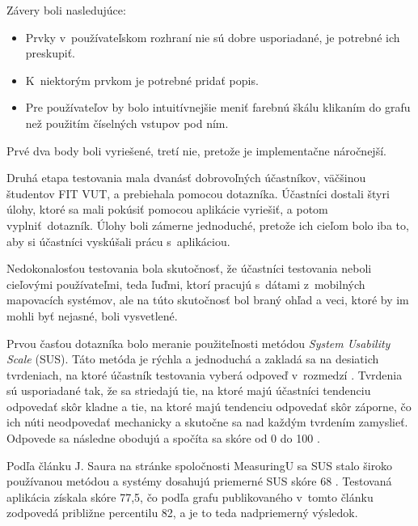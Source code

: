 Závery boli nasledujúce:
\begin{itemize}
    \item Prvky v~používateľskom rozhraní nie sú dobre usporiadané, je potrebné ich preskupiť.
    \item K~niektorým prvkom je potrebné pridať popis.
    \item Pre používateľov by bolo intuitívnejšie meniť farebnú škálu klikaním do grafu než použitím číselných vstupov pod ním.
\end{itemize}

Prvé dva body boli vyriešené, tretí nie, pretože je implementačne náročnejší.

Druhá etapa testovania mala dvanásť dobrovoľných účastníkov, väčšinou študentov FIT VUT, a prebiehala pomocou dotazníka. Účastníci dostali štyri úlohy, ktoré sa mali pokúsiť pomocou aplikácie vyriešiť, a potom vyplniť~dotazník. Úlohy boli zámerne jednoduché, pretože ich cieľom bolo iba to, aby si účastníci vyskúšali prácu s~aplikáciou.

Nedokonalosťou testovania bola skutočnosť, že účastníci testovania neboli cieľovými používateľmi, teda ľuďmi, ktorí pracujú s~dátami z~mobilných mapovacích systémov, ale na túto skutočnosť bol braný ohľad a veci, ktoré by im mohli byť nejasné, boli vysvetlené.

Prvou časťou dotazníka bolo meranie použiteľnosti metódou \emph{System Usability Scale} (SUS). Táto metóda je rýchla a jednoduchá a zakladá sa na desiatich tvrdeniach, na ktoré účastník testovania vyberá odpoveď v~rozmedzí . Tvrdenia sú usporiadané tak, že sa striedajú tie, na ktoré majú účastníci tendenciu odpovedať skôr kladne a tie, na ktoré majú tendenciu odpovedať skôr záporne, čo ich núti neodpovedať mechanicky a skutočne sa nad každým tvrdením zamyslieť. Odpovede sa následne obodujú a spočíta sa skóre od 0 do 100 \cite{brooke_sus}.

Podľa článku J. Saura na stránke spoločnosti MeasuringU sa SUS stalo široko používanou metódou a systémy dosahujú priemerné SUS skóre 68 \cite{sauro_sus}. Testovaná aplikácia získala skóre 77,5, čo podľa grafu publikovaného v~tomto článku zodpovedá približne percentilu 82, a je to teda nadpriemerný výsledok.

